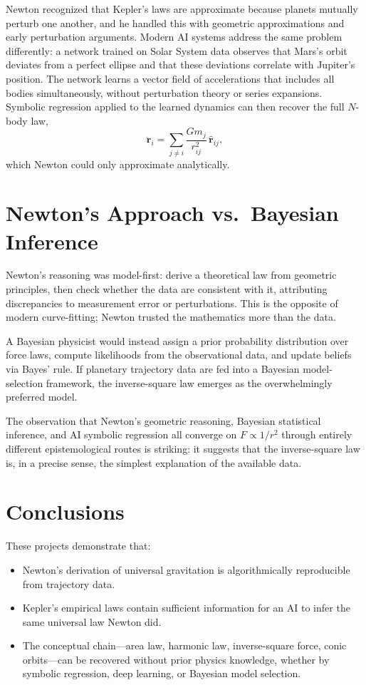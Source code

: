 \documentclass[12pt]{article}
\begin{document}
Newton recognized that Kepler's laws are approximate because planets
mutually perturb one another, and he handled this with geometric
approximations and early perturbation arguments.
Modern AI systems address the same problem differently: a network trained on
Solar System data observes that Mars's orbit deviates from a perfect ellipse
and that these deviations correlate with Jupiter's position.
The network learns a vector field of accelerations that includes all bodies
simultaneously, without perturbation theory or series expansions.
Symbolic regression applied to the learned dynamics can then recover the
full $N$-body law,
\[
  \ddot{\mathbf{r}}_{i} = \sum_{j \neq i} \frac{G m_{j}}{r_{ij}^{2}}\,\hat{\mathbf{r}}_{ij},
\]
which Newton could only approximate analytically.

\section{Newton's Approach vs.\ Bayesian Inference}

Newton's reasoning was model-first: derive a theoretical law from geometric
principles, then check whether the data are consistent with it, attributing
discrepancies to measurement error or perturbations.
This is the opposite of modern curve-fitting; Newton trusted the mathematics
more than the data.

A Bayesian physicist would instead assign a prior probability distribution
over force laws, compute likelihoods from the observational data, and
update beliefs via Bayes' rule.
If planetary trajectory data are fed into a Bayesian model-selection
framework, the inverse-square law emerges as the overwhelmingly preferred
model.

The observation that Newton's geometric reasoning, Bayesian statistical
inference, and AI symbolic regression all converge on $F \propto 1/r^{2}$
through entirely different epistemological routes is striking: it suggests
that the inverse-square law is, in a precise sense, the simplest explanation
of the available data.

\section{Conclusions}

These projects demonstrate that:
\begin{itemize}
  \item Newton's derivation of universal gravitation is algorithmically
        reproducible from trajectory data.
  \item Kepler's empirical laws contain sufficient information for an AI to
        infer the same universal law Newton did.
  \item The conceptual chain---area law, harmonic law, inverse-square
        force, conic orbits---can be recovered without prior physics
        knowledge, whether by symbolic regression, deep learning, or
        Bayesian model selection.
\end{itemize}
\end{document}
